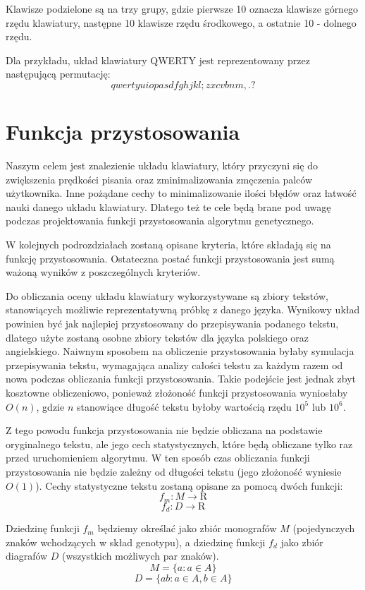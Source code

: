 \documentclass[brudnopis]{xmgr}
\begin{document}
Klawisze podzielone są na trzy grupy, gdzie pierwsze 10 oznacza klawisze górnego rzędu klawiatury, następne 10 klawisze rzędu środkowego, a ostatnie 10 - dolnego rzędu.

Dla przykładu, układ klawiatury QWERTY jest reprezentowany przez następującą permutację:
$$ qwertyuiopasdfghjkl;zxcvbnm,.? $$


\section{Funkcja przystosowania}

Naszym celem jest znalezienie układu klawiatury, który przyczyni się do zwiększenia prędkości pisania oraz zminimalizowania zmęczenia palców użytkownika. Inne pożądane cechy to minimalizowanie ilości błędów oraz łatwość nauki danego układu klawiatury. Dlatego też te cele będą brane pod uwagę podczas projektowania funkcji przystosowania algorytmu genetycznego.

W kolejnych podrozdziałach zostaną opisane kryteria, które składają się na funkcję przystosowania. Ostateczna postać funkcji przystosowania jest sumą ważoną wyników z poszczególnych kryteriów.

Do obliczania oceny układu klawiatury wykorzystywane są zbiory tekstów, stanowiących możliwie reprezentatywną próbkę z danego języka. Wynikowy układ powinien być jak najlepiej przystosowany do przepisywania podanego tekstu, dlatego użyte zostaną osobne zbiory tekstów dla języka polskiego oraz angielskiego. Naiwnym sposobem na obliczenie przystosowania byłaby symulacja przepisywania tekstu, wymagająca analizy całości tekstu za każdym razem od nowa podczas obliczania funkcji przystosowania. Takie podejście jest jednak zbyt kosztowne obliczeniowo, ponieważ złożoność funkcji przystosowania wyniosłaby $ O(n) $, gdzie $ n $ stanowiące długość tekstu byłoby wartością rzędu $ 10^5 $ lub $ 10^6 $.

Z tego powodu funkcja przystosowania nie będzie obliczana na podstawie oryginalnego tekstu, ale jego cech statystycznych, które będą obliczane tylko raz przed uruchomieniem algorytmu. W ten sposób czas obliczania funkcji przystosowania nie będzie zależny od długości tekstu (jego złożoność wyniesie $ O(1) $). Cechy statystyczne tekstu zostaną opisane za pomocą dwóch funkcji:
$$ f_m : M \rightarrow \mathrm{R} $$
$$ f_d : D \rightarrow \mathrm{R} $$

Dziedzinę funkcji $ f_m $ będziemy określać jako zbiór monografów $ M $ (pojedynczych znaków wchodzących w skład genotypu), a dziedzinę funkcji $ f_d $ jako zbiór diagrafów $ D $ (wszystkich możliwych par znaków).
$$ M = \{ a : a \in A \} $$
$$ D = \{ ab : a \in A, b \in A \} $$
\end{document}
